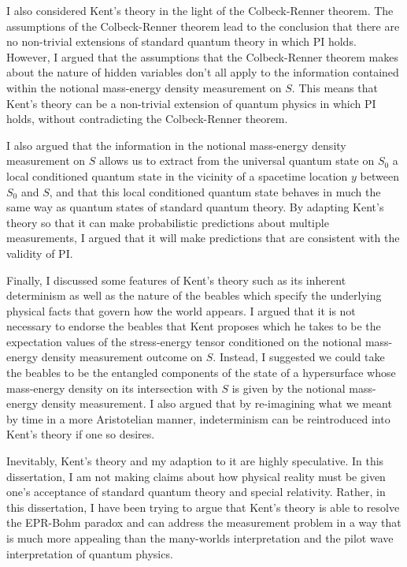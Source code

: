 I also considered Kent's theory in the light of the Colbeck-Renner theorem. The assumptions of the Colbeck-Renner theorem lead to the conclusion that there are no non-trivial extensions of standard quantum theory in which PI holds. However, I argued that the assumptions that the Colbeck-Renner theorem makes about the nature of hidden variables don't all apply to the information contained within the notional mass-energy density measurement on $S$. This means that Kent's theory can be a non-trivial extension of quantum physics in which PI holds, without contradicting the Colbeck-Renner theorem. 

I also argued that the information in the notional mass-energy density measurement on $S$ allows us to extract from the universal quantum state on $S_0$ a local conditioned quantum state in the vicinity of a spacetime location $y$ between $S_0$ and $S$, and that this local conditioned quantum state behaves in much the same way as quantum states of standard quantum theory. By adapting Kent's theory so that it can make probabilistic predictions about multiple measurements, I argued that it will make predictions that are consistent with the validity of PI. 

Finally, I discussed some features of Kent's theory such as its inherent determinism as well as the nature of the beables which specify the underlying physical facts that govern how the world appears. I argued that it is not necessary to endorse the beables that Kent proposes which he takes to be the expectation values of the stress-energy tensor conditioned on the notional mass-energy density measurement outcome on $S$. Instead, I suggested we could take the beables to be the entangled components of the state of a hypersurface whose mass-energy density on its intersection with $S$ is given by the notional mass-energy density measurement. I also argued that by re-imagining what we meant by time in a more Aristotelian manner, indeterminism can be reintroduced into Kent's theory if one so desires. 

Inevitably, Kent's theory and my adaption to it are highly speculative. In this dissertation, I am not making claims about how physical reality must be given one's acceptance of standard quantum theory and special relativity. Rather, in this dissertation, I have been trying to argue that Kent's theory is able to resolve the EPR-Bohm paradox and can address the measurement problem in a way that is much more appealing than the many-worlds interpretation and the pilot wave interpretation of quantum physics.